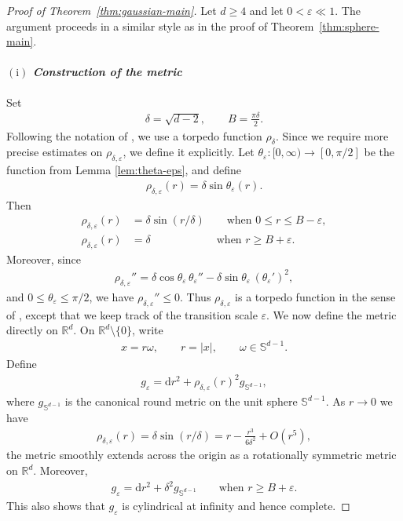 \documentclass[11pt,reqno]{amsart}
\numberwithin{equation}{section}
\theoremstyle{definition}
\theoremstyle{remark}
\newcommand{\te}{\theta}
\newcommand{\ud}{\mathrm{d}}
\newcommand{\0}{\emptyset}
\newcommand{\veps}{\varepsilon}
\newcommand{\bbR}{\mathbb R}
\newcommand{\bbS}{\mathbb S}
\begin{document}
\begin{proof}[Proof of Theorem~\ref{thm:gaussian-main}]
Let \(d\geq4\) and let \(0<\veps\ll1\). The argument proceeds in a similar style as in the proof of Theorem~\ref{thm:sphere-main}. 
\paragraph{$\mathrm{(i)}$ \textit{Construction of the metric}} Set
\begin{align}
        \delta=\sqrt{d-2},
        \qquad
        B=\frac{\pi\delta}{2}.
\end{align}
Following the notation of \cite[Definition 2.4]{botvinnik2010homotopy}, we use a
torpedo function \(\rho_\delta\). Since we require more precise estimates on
\(\rho_{\delta,\veps}\), we define it explicitly. Let
\(\te_\veps:[0,\infty)\to[0,\pi/2]\) be the function from Lemma
\ref{lem:theta-eps}, and define
\begin{align}
        \rho_{\delta,\veps}(r)=\delta\sin\te_\veps(r).
\end{align}
Then
\begin{align}
        \rho_{\delta,\veps}(r)
        &=
        \delta\sin(r/\delta)
        \qquad\text{when }0\leq r\leq B-\veps,\\
        \rho_{\delta,\veps}(r)
        &=
        \delta
        \qquad\qquad\qquad\text{when }r\geq B+\veps.
\end{align}
Moreover, since
\begin{align}
        \rho_{\delta,\veps}''
        =
        \delta\cos\te_\veps\,\te_\veps''
        -
        \delta\sin\te_\veps\,(\te_\veps')^2,
\end{align}
and $0\leq\te_\veps\leq\pi/2$, we have \(\rho_{\delta,\veps}''\leq0\). Thus
\(\rho_{\delta,\veps}\) is a torpedo function in the sense of
\cite[Definition 2.4]{botvinnik2010homotopy}, except that we keep track of the
transition scale \(\veps\).
We now define the metric directly on \(\bbR^d\). On \(\bbR^d\setminus\{0\}\),
write
\begin{align}
        x=r\omega,
        \qquad
        r=|x|,
        \qquad
        \omega\in\bbS^{d-1}.
\end{align}
Define
\begin{align}\label{eq:noncompact-torpedo-metric}
        g_\veps
        =
        \ud r^2+\rho_{\delta,\veps}(r)^2g_{\bbS^{d-1}},
\end{align}
where \(g_{\bbS^{d-1}}\) is the canonical round metric on the unit sphere
\(\bbS^{d-1}\). As \(r\to0\) we have
\begin{align}
        \rho_{\delta,\veps}(r)
        =
        \delta\sin(r/\delta)
        =
        r-\frac{r^3}{6\delta^2}+O(r^5),
\end{align}
the metric smoothly extends across the origin as a rotationally symmetric metric
on \(\bbR^d\). Moreover,
\begin{align}
        g_\veps
        =
        \ud r^2+\delta^2g_{\bbS^{d-1}}
        \qquad\text{when }r\geq B+\veps.
\end{align}
This also shows that \(g_\veps\) is cylindrical at infinity and hence complete.


\end{proof}
\end{document}
